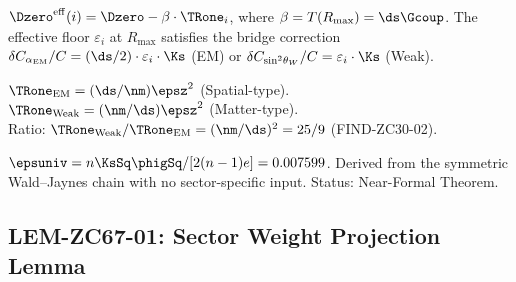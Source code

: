 \documentclass[12pt, a4paper]{article}
\renewcommand{\swsq}{\sin^2\!\theta_W}
\renewcommand{\aEM}{\alpha_{\rm EM}}
\begin{document}
\begin{formalbox}[title={Pillar 2: R-Layer Bridge Mechanism (ZC65/LEM-ZC65-01)}]
$\Dzero^{\rm eff}(i) = \Dzero - \beta\cdot\TRone_i$,
where $\beta = T(R_{\max}) = \ds\Gcoup$.
The effective floor $\varepsilon_i$ at $R_{\max}$ satisfies
the bridge correction $\delta C_{\aEM}/C = (\ds/2)\cdot\varepsilon_i\cdot\Ks$
(EM) or $\delta C_{\swsq}/C = \varepsilon_i\cdot\Ks$ (Weak).
\end{formalbox}

\begin{formalbox}[title={Pillar 3: Sector Crossing Costs
  (ZC27/THM-ZC27-01, ZC30/THM-ZC30-01)}]
$\TRone_{\rm EM}   = (\ds/\nm)\epsz^{2}$ (Spatial-type).\\
$\TRone_{\rm Weak} = (\nm/\ds)\epsz^{2}$ (Matter-type).\\
Ratio: $\TRone_{\rm Weak}/\TRone_{\rm EM} = (\nm/\ds)^{2} = 25/9$ (FIND-ZC30-02).
\end{formalbox}

\begin{formalbox}[title={Pillar 4: Universal Floor (THM-ZC54-01)}]
$\epsuniv = n\KsSq\phigSq/[2(n-1)e] = 0.007599$.
Derived from the symmetric Wald--Jaynes chain with no
sector-specific input.
Status: Near-Formal Theorem.
\end{formalbox}

\subsection{LEM-ZC67-01: Sector Weight Projection Lemma}
\label{sec:lem}

\end{document}
